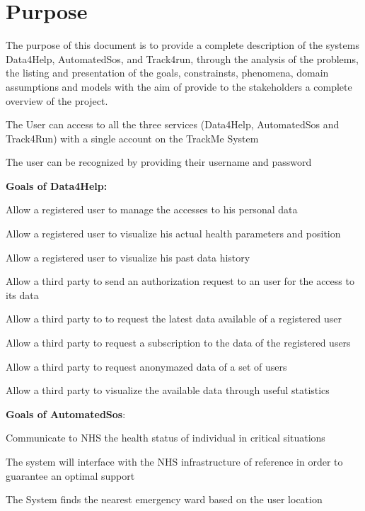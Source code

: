 \section{Purpose}
The purpose of this document is to provide a complete description of the systems Data4Help, AutomatedSos, and Track4run, through the analysis of the problems, the listing and presentation of the goals, constrainsts, phenomena, domain assumptions and models with the aim of provide to the stakeholders a complete overview of the project.

\begin{goalList}
\begin{enumerate}[label={[}G\arabic*{]}]

    \item \label{goal:trackme1} The User can access to all the three services (Data4Help,     AutomatedSos and Track4Run) with a single account on the TrackMe System
    \item \label{goal:trackme2}The user can be recognized by providing their username and     password \newline

\textbf{Goals of Data4Help:}

    \item \label{goal:user1} Allow a registered user to manage the accesses to his personal     data
    \item \label{goal:user2}Allow a registered user to visualize his actual health     parameters and position
    \item \label{goal:user3}Allow a registered user to visualize his past data history
    \item \label{goal:parties1}Allow a third party to send an authorization request to an     user for the access to its data
    \item \label{goal:parties2}Allow a third party to to request the latest data available     of a registered user
    \item \label{goal:parties3}Allow a third party to request a subscription to the data of     the registered users
    \item \label{goal:parties4}Allow a third party to request anonymazed data of a set of     users 
    \item \label{goal:parties5}Allow a third party to visualize the available data through     useful statistics 

\textbf{Goals of AutomatedSos}:

    \item \label{goal:sos1}Communicate to NHS the health status of individual in critical     situations
    \item \label{goal:sos2}The system will interface with the NHS infrastructure of         reference in order to guarantee an optimal support
    \item \label{goal:sos3}The System finds the nearest emergency ward based on the user     location


\end{enumerate}
\end{goalList}
